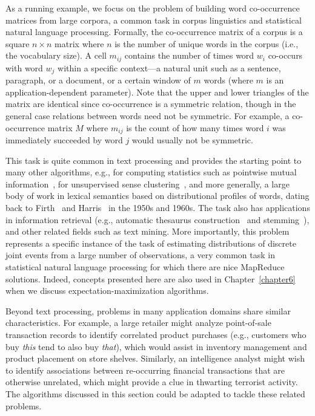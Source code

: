 As a running example, we focus on the problem of building word
co-occurrence matrices from large corpora, a common task in corpus
linguistics and statistical natural language processing.  Formally,
the co-occurrence matrix of a corpus is a square $n \times n$ matrix
where $n$ is the number of unique words in the corpus
(i.e., the vocabulary size).  A cell $m_{ij}$ contains the number of
times word $w_i$ co-occurs with word $w_j$ within a specific
context---a natural unit such as a sentence, paragraph, or a document,
or a certain window of $m$ words (where $m$ is an
application-dependent parameter).  Note that the upper and lower
triangles of the matrix are identical since co-occurrence is a
symmetric relation, though in the general case relations between words
need not be symmetric.  For example, a co-occurrence matrix $M$ where
$m_{ij}$ is the count of how many times word $i$ was immediately
succeeded by word $j$ would usually not be symmetric.

This task is quite common in text processing and provides the starting
point to many other algorithms, e.g., for computing statistics such as
pointwise mutual information~\cite{Church_Hanks_1990}, for
unsupervised sense clustering~\cite{Schutze_CL1998}, and more
generally, a large body of work in lexical semantics based on
distributional profiles of words, dating back to
Firth~\cite{Firth_1957} and Harris~\cite{Harris_1968} in the 1950s and
1960s.  The task also has applications in information retrieval (e.g.,
automatic thesaurus construction~\cite{Schutze_Pedersen_IPM1997} and
stemming~\cite{Xu_Croft_TOIS1998}), and other related fields such as
text mining.  More importantly, this problem represents a specific
instance of the task of estimating distributions of discrete joint
events from a large number of observations, a very common task in
statistical natural language processing for which there are nice
MapReduce solutions.  Indeed, concepts presented here are also used in
Chapter~\ref{chapter6} when we discuss expectation-maximization
algorithms.

Beyond text processing, problems in many application domains share
similar characteristics.  For example, a large retailer might analyze
point-of-sale transaction records to identify correlated product
purchases (e.g., customers who buy \emph{this} tend to also buy \emph{
  that}), which would assist in inventory management and product
placement on store shelves.  Similarly, an intelligence analyst might
wish to identify associations between re-occurring financial
transactions that are otherwise unrelated, which might provide a clue
in thwarting terrorist activity.  The algorithms discussed in this
section could be adapted to tackle these related problems.

